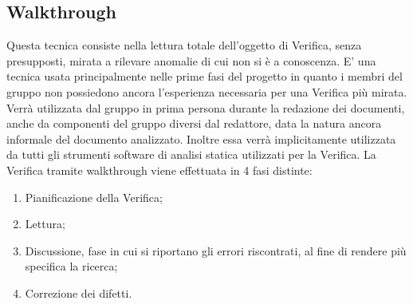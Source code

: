 \subsection{Walkthrough}
\label{11.2}
Questa tecnica consiste nella lettura totale dell'oggetto di Verifica, senza presupposti, mirata a rilevare anomalie di cui non si è a conoscenza. E' una tecnica usata principalmente nelle prime fasi del progetto in quanto i membri del gruppo non possiedono ancora l'esperienza necessaria per una Verifica più mirata. Verrà utilizzata dal gruppo in prima persona durante la redazione dei documenti, anche da componenti del gruppo diversi dal redattore, data la natura ancora informale del documento analizzato. Inoltre essa verrà implicitamente utilizzata da tutti gli strumenti software di analisi statica utilizzati per la Verifica. 
La Verifica tramite walkthrough viene effettuata in 4 fasi distinte:
\begin{enumerate}
\item Pianificazione della Verifica;
\item Lettura;
\item Discussione, fase in cui si riportano gli errori riscontrati, al fine di rendere più specifica la ricerca;
\item Correzione dei difetti.
\end{enumerate}

